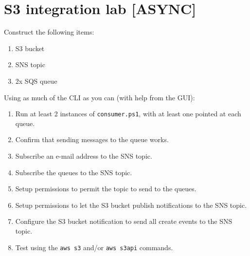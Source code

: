 \chapter{S3 integration lab [ASYNC]}
\label{ch:s3-integration-lab}

Construct the following items:

\begin{enumerate}
\item S3 bucket
\item SNS topic
\item 2x SQS queue
\end{enumerate}

Using as much of the CLI as you can (with help from the GUI):

\begin{enumerate}
\item Run at least 2 instances of \texttt{consumer.ps1}, with at least one pointed at each queue.
\item Confirm that sending messages to the queue works.
\item Subscribe an e-mail address to the SNS topic.
\item Subscribe the queues to the SNS topic.
\item Setup permissions to permit the topic to send to the queues.
\item Setup permissions to let the S3 bucket publish notifications to the SNS topic.
\item Configure the S3 bucket notification to send all create events to the SNS topic.
\item Test using the \texttt{aws s3} and/or \texttt{aws s3api} commands.
\end{enumerate}